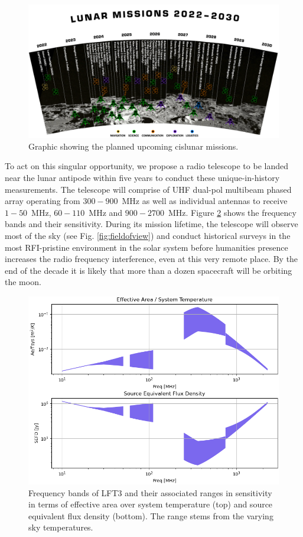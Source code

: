 \begin{figure}
    \centering
    \includegraphics[width=0.95\linewidth]{figures/missions.png}
    \caption{Graphic showing the planned upcoming cislunar missions.}
    \label{fig:missions}
\end{figure}

To act on this singular opportunity, we propose a radio telescope to be landed near the lunar antipode within five years to conduct these unique-in-history measurements. The telescope will comprise of UHF dual-pol multibeam phased array operating from $300-900$~MHz as well as individual antennas to receive $1-50$~MHz, $60-110$~MHz and $900-2700$~MHz. Figure \ref{fig:freqbands} shows the frequency bands and their sensitivity.  During its mission lifetime, the telescope will observe most of the sky (see Fig. \ref{fig:fieldofview}) and conduct historical surveys in the most RFI-pristine environment in the solar system before humanities presence increases the radio frequency interference, even at this very remote place.  By the end of the decade it is likely that more than a dozen spacecraft will be orbiting the moon.

\begin{figure}
    \centering
    \includegraphics[width=0.75\linewidth]{figures/freqbands.png}
    \caption{Frequency bands of LFT3 and their associated ranges in sensitivity in terms of effective area over system temperature (top) and source equivalent flux density (bottom). The range stems from the varying sky temperatures.}
    \label{fig:freqbands}
\end{figure}

